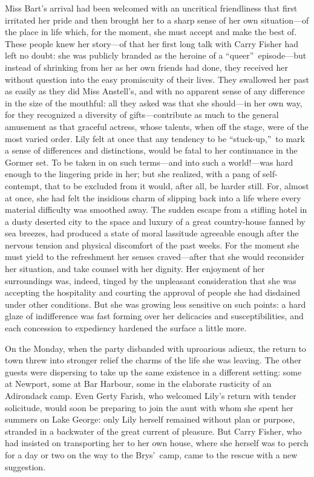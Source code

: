 \documentclass[12pt,a4paper]{book}
\begin{document}
Miss Bart's arrival had been welcomed with an uncritical
friendliness that first irritated her pride and then brought her
to a sharp sense of her own situation---of the place in life
which, for the moment, she must accept and make the best of. 
These people knew her story---of that her first long talk with
Carry Fisher had left no doubt: she was publicly branded as the
heroine of a ``queer''\ episode---but instead of shrinking from her
as her own friends had done, they received her without question
into the easy promiscuity of their lives. They swallowed her past
as easily as they did Miss Anstell's, and with no apparent sense
of any difference in the size of the mouthful: all they asked was
that she should---in her own way, for they recognized a diversity
of gifts---contribute as much to the general amusement as that
graceful actress, whose talents, when off the stage, were of the
most varied order. Lily felt at once that any tendency to be
``stuck-up,''\ to mark a sense of differences and distinctions,
would be fatal to her continuance in the Gormer set. To be taken
in on such terms---and into such a world!---was hard enough to the
lingering pride in her; but she realized, with a pang of
self-contempt, that to be excluded from it would, after all, be
harder still. For, almost at once, she had felt the insidious
charm of slipping back into a life where every material
difficulty was smoothed away. The sudden escape from a stifling
hotel in a dusty deserted city to the space and luxury of a great
country-house fanned by sea breezes, had produced a state of
moral lassitude agreeable enough after the nervous tension and
physical discomfort of the past weeks. For the moment she must
yield to the refreshment her senses craved---after that she would
reconsider her situation, and take counsel with her dignity. Her
enjoyment of her surroundings was, indeed, tinged by the
unpleasant consideration that she was accepting the hospitality
and courting the approval of people she had disdained under other
conditions. But she was growing less sensitive on such points: a
hard glaze of indifference was fast forming over her delicacies
and susceptibilities, and each concession to expediency hardened
the surface a little more.





On the Monday, when the party disbanded with uproarious adieux,
the return to town threw into stronger relief the charms of the
life she was leaving. The other guests were dispersing to take up
the same existence in a different setting: some at Newport, some
at Bar Harbour, some in the elaborate rusticity of an Adirondack
camp. Even Gerty Farish, who welcomed Lily's return with tender
solicitude, would soon be preparing to join the aunt with whom she
spent her summers on Lake George: only Lily herself remained
without plan or purpose, stranded in a backwater of the great
current of pleasure. But Carry Fisher, who had insisted on
transporting her to her own house, where she herself was to perch
for a day or two on the way to the Brys'\ camp, came to the rescue
with a new suggestion.
\end{document}
